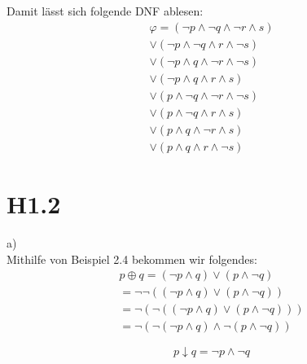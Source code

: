 \documentclass{article}
\begin{document}
Damit lässt sich folgende DNF ablesen:
\begin{align*}
    \varphi = (\neg p \wedge \neg q \wedge \neg r \wedge s) \\ 
    \vee (\neg p \wedge \neg q \wedge r \wedge \neg s) \\
    \vee (\neg p \wedge q \wedge \neg r \wedge \neg s) \\
    \vee (\neg p \wedge q \wedge r \wedge s) \\
    \vee (p \wedge \neg q \wedge \neg r \wedge \neg s) \\
    \vee (p \wedge \neg q \wedge r \wedge s) \\
    \vee (p \wedge q \wedge \neg r \wedge s) \\
    \vee (p \wedge q \wedge r \wedge \neg s) 
\end{align*}

\section{H1.2}
a) \\ 
Mithilfe von Beispiel 2.4 bekommen wir folgendes: 
\begin{align*}
    p \oplus q = (\neg p \wedge q) \vee (p \wedge \neg q) \\
               = \neg\neg((\neg p \wedge q) \vee (p \wedge \neg q)) \\
               = \neg(\neg((\neg p \wedge q) \vee (p \wedge \neg q))) \\
               = \neg(\neg(\neg p \wedge q) \wedge \neg(p \wedge \neg q)) 
\end{align*}

\[ 
    p \downarrow q = \neg p \wedge \neg q
\]
\end{document}
